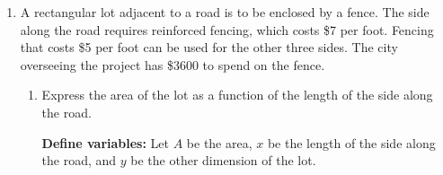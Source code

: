 \documentclass{article}
\begin{document}
\begin{enumerate}
\begin{enumerate}[resume]
  \item
    \begin{problem}[0.75in]
      Is $f$ continuous on $(-4, 3]$? 
    \end{problem}

\begin{solution}

\end{solution}

  \item

    \begin{workshop}
      $f$ is continuous on $(-4, 3]$, and it has only one critical point in this interval. Since that critical point is a local maximum, $f$ must be increasing on $(-4, 2)$ and decreasing on $(2, 3)$, so $f$ must have a global maximum at $x = 2$. There's no more work to do!

      Make sure students are clear that this only works because $f$ has only one critical point in $(-4, 3]$. 
    \end{workshop}

    \begin{problem}[\vfill]
      Does $f$ have a global maximum on $(-4, 3]$? If so, where? What's the least amount of work you can do to answer this? 
    \end{problem}    


  \end{enumerate}
  


\item  \label{pasachoff-4.3.2} %

  A rectangular lot adjacent to a road is to be enclosed by a fence. The side along the road requires reinforced fencing, which costs \$7 per foot. Fencing that costs \$5 per foot can be used for the other three sides. The city overseeing the project has \$3600 to spend on the fence. 

  \begin{enumerate}
  \item
    \begin{problem}[\vfill]
      Express the area of the lot as a function of the length of the side along the road. 
    \end{problem}

    \begin{solution}
      {\textbf{Define variables:} Let $A$ be the area, $x$ be the
        length of the side along the road, and $y$ be the other dimension of
        the lot.}
      \begin{center}
      \end{center}


\end{solution}
\end{enumerate}
\end{enumerate}
\end{document}
